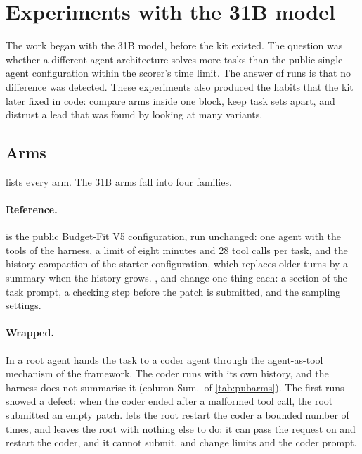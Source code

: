\section{Experiments with the 31B model}\label{sec:big}

The work began with the 31B model, before the kit existed. The question was whether a different agent architecture
solves more tasks than the public single-agent configuration within the scorer's time limit. The answer of \RunsThirtyOne{}
runs is that no difference was detected. These experiments also produced the habits that the kit later fixed in code:
compare arms inside one block, keep task sets apart, and distrust a lead that was found by looking at many variants.

\subsection{Arms}\label{sec:big-arms}

 lists every arm. The 31B arms fall into four families.

\paragraph{Reference.}  is the public Budget-Fit V5 configuration, run unchanged: one agent with the
tools of the harness, a limit of eight minutes and 28 tool calls per task, and the history compaction of the starter
configuration, which replaces older turns by a summary when the history grows. ,  and
 change one thing each: a section of the task prompt, a checking step before the patch is submitted, and
the sampling settings.

\paragraph{Wrapped.} In  a root agent hands the task to a coder agent through the agent-as-tool mechanism of
the framework. The coder runs with its own history, and the harness does not summarise it (column Sum.\ of
\cref{tab:pubarms}). The first runs showed a defect: when the coder ended after a malformed tool call, the root
submitted an empty patch.  lets the root restart the coder a bounded number of times, and  leaves the
root with nothing else to do: it can pass the request on and restart the coder, and it cannot submit.  and
 change limits and the coder prompt.

